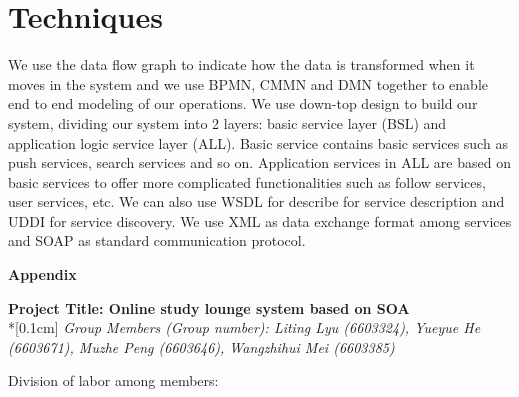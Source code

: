 \documentclass[runningheads]{llncs}
\begin{document}
\section*{Techniques}
We use the data flow graph to indicate how the data is transformed when it moves in the system and we use BPMN, CMMN and DMN  together to enable end to end modeling of our operations.
We use down-top design to build our system, dividing our system into 2 layers: basic service layer (BSL) and application logic service layer (ALL). Basic service contains basic services such as push services, search services and so on. Application services in ALL are based on basic services to offer more complicated functionalities such as follow services, user services, etc. We can also use WSDL for describe for service description and UDDI for service discovery. We use XML as data exchange format among services and SOAP as standard communication protocol.
\clearpage
\begin{flushleft}
    \huge{\textbf{Appendix}}
    \end{flushleft}
    \begin{center}
    \Large{\textbf{Project Title: Online study lounge system based on SOA }} \\*[0.1cm]%
    \large{\emph{Group Members (Group number): Liting Lyu (6603324), Yueyue  He (6603671), Muzhe Peng (6603646), Wangzhihui Mei (6603385)}} %
    \end{center}
   Division of labor among members:
\end{document}

